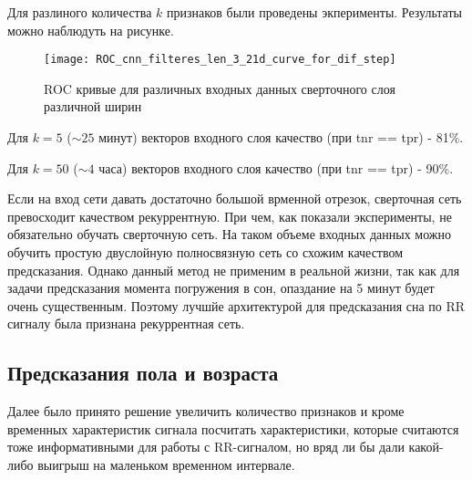 Для разлиного количества $k$ признаков были проведены экперименты. Результаты можно наблюдуть на рисунке.

\begin{figure}[h!]
	\begin{center}
		\texttt{[image: ROC\_cnn\_filteres\_len\_3\_21d\_curve\_for\_dif\_step]}
		\caption{ROC кривые для различных входных данных сверточного слоя различной ширин}
		\label{ris:roc_cnn}
	\end{center}
\end{figure}

Для $k = 5 $  ($\sim 25$ минут) векторов входного слоя качество (при tnr == tpr) - 81\%.

Для $k = 50$ ($\sim 4$ часа) векторов входного слоя качество (при tnr == tpr) - 90\%.

Если на вход сети давать достаточно большой врменной отрезок, сверточная сеть превосходит качеством рекуррентную. При чем, как показали эксперименты, не обязательно обучать сверточную сеть. На таком объеме входных данных можно обучить простую двуслойную полносвязную сеть со схожим качеством предсказания. Однако данный метод не применим в реальной жизни, так как для задачи предсказания момента погружения в сон, опаздание на 5 минут будет очень существенным. Поэтому лучшйе архитектурой для предсказания сна по RR сигналу была признана рекуррентная сеть.
 

\subsection{Предсказания пола и возраста}
Далее было принято решение увеличить количество признаков и кроме временных характеристик сигнала посчитать характеристики, которые считаются тоже информативными для работы с RR-сигналом, но вряд ли бы дали какой-либо выигрыш на маленьком временном интервале.


